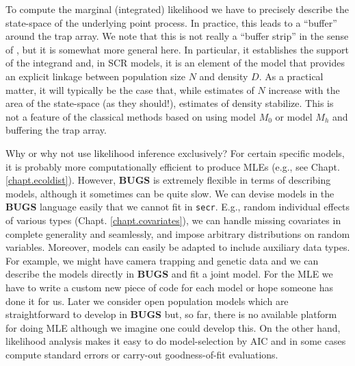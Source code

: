 {To compute the marginal (integrated) likelihood we have to precisely describe the
state-space of the underlying point process. In practice, this leads
to a ``buffer'' around the trap array. We note that this is not really a
``buffer strip'' in the sense of \citet{wilson_anderson:1985a},  
but it is somewhat more general here. In particular,
it establishes the support of the integrand and, 
in SCR models, it is an element of the model that
provides an explicit
linkage between population size $N$ and density $D$.
As a practical 
matter, it will typically be the case that, while estimates of $N$
increase with the area of the state-space (as they should!), estimates of density
stabilize. This is not a feature of the classical methods based on
using model $M_0$ or model $M_h$ and buffering the trap array.

Why or why not use likelihood inference exclusively? For certain
specific models, it is probably more computationally efficient to
produce MLEs (e.g., see Chapt. \ref{chapt.ecoldist}). However, {\bf BUGS} is extremely flexible in terms of
describing models, although it sometimes can be quite slow. We can
devise models in the {\bf BUGS} language easily that we cannot fit in
\mbox{\tt secr}. E.g.,
random individual effects of various types
(Chapt. \ref{chapt.covariates}), we can 
handle missing covariates in complete generality and seamlessly, and
impose arbitrary distributions on random variables. Moreover, models
can easily be adapted to include auxiliary data types. For example, we
might have camera trapping and genetic data and we can describe the
models directly in {\bf BUGS} and fit a joint model. For the MLE we have
to write a custom new piece of code for each model or hope someone has
done it for us.  Later we consider open population models which are
straightforward to develop in {\bf BUGS} but, so far, there is no
available platform for doing MLE although we imagine one could develop
this.  On
the other hand, likelihood analysis makes it easy to do
model-selection by AIC and in some cases compute standard errors or
carry-out goodness-of-fit evaluations. 
\begin{comment}
Another thing that is more conceptual here is non-CSR point
processes (Chapt. \ref{chapt.state-space}) and generating predictions of how many
individuals have home range centers in any particular polygon.  Basic
benefits of Bayesian analysis have been discussed elsewhere (XXXXXXXX Chapter
2? BPA book? Link and Barker?) and we believe these are compelling.
\end{comment}

}
